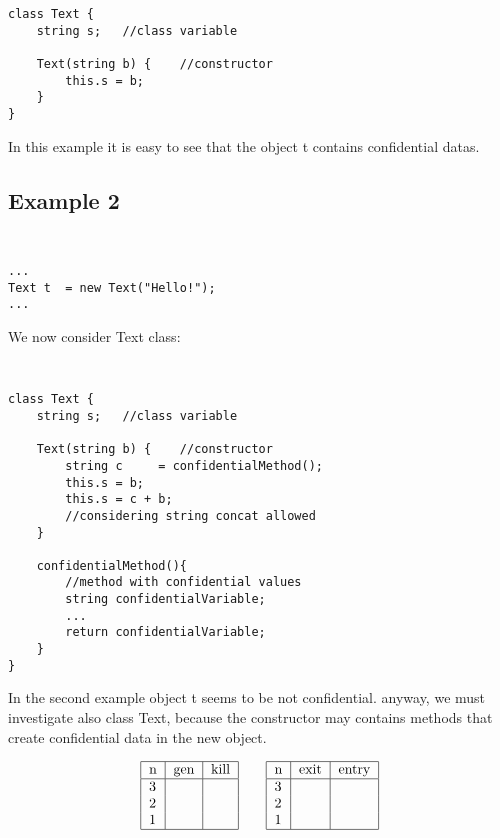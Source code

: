 \documentclass[letterpaper,twocolumn,10pt]{article}
\begin{document}
\begin{verbatim}
class Text {
    string s;	//class variable
	
    Text(string b) { 	//constructor
        this.s = b;
    }
}
\end{verbatim}

In this example it is easy to see that the object t contains confidential datas.\\

\subsection{Example 2}
{\tt \small
\begin{verbatim}
...
Text t	= new Text("Hello!");
...
\end{verbatim}
}
We now consider Text class: \\
{\tt \small
\begin{verbatim}
class Text {
    string s;	//class variable
	
    Text(string b) { 	//constructor
        string c	 = confidentialMethod();
        this.s = b;
        this.s = c + b;
        //considering string concat allowed
    }
	
    confidentialMethod(){ 
        //method with confidential values
        string confidentialVariable;		
        ...
        return confidentialVariable;
    }
}
\end{verbatim}
}

In the second example object t seems to be not confidential. anyway, we must investigate also class Text, because the constructor may contains methods that create confidential data in the new object.

\begin{align*}
\begin{tabular}{|l|*{2}{c|}}
  \hline
  n & gen & kill  \\
  \hline 
  3 &  & \\ 
  2 &  &\\
  1 &  & \\
  \hline
\end{tabular}
\qquad
\begin{tabular}{|l|*{2}{c|}}
  \hline
  n & exit & entry  \\
  \hline 
  3 &  & \\ 
  2 &  &\\
  1 &  & \\
  \hline
\end{tabular}
\end{align*}
\end{document}
